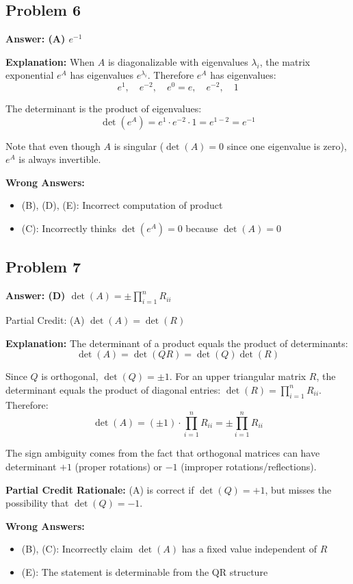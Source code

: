 \documentclass[12pt]{amsart}
\newcommand{\correct}[1]{{\color{correctgreen}\textbf{#1}}}
\newcommand{\partcred}[1]{{\color{partialblue}#1}}
\begin{document}
{\subsection*{Problem 6}
\correct{Answer: (A) $e^{-1}$}

\textbf{Explanation:} When $A$ is diagonalizable with eigenvalues $\lambda_i$, the matrix exponential $e^A$ has eigenvalues $e^{\lambda_i}$. Therefore $e^A$ has eigenvalues:
$$e^{1}, \quad e^{-2}, \quad e^{0} = e, \quad e^{-2}, \quad 1$$

The determinant is the product of eigenvalues:
$$\det(e^A) = e^{1} \cdot e^{-2} \cdot 1 = e^{1-2} = e^{-1}$$

Note that even though $A$ is singular ($\det(A) = 0$ since one eigenvalue is zero), $e^A$ is always invertible.

\textbf{Wrong Answers:}
\begin{itemize}
\item (B), (D), (E): Incorrect computation of product
\item (C): Incorrectly thinks $\det(e^A) = 0$ because $\det(A) = 0$
\end{itemize}

\subsection*{Problem 7}
\correct{Answer: (D) $\det(A) = \pm \prod_{i=1}^n R_{ii}$}

\partcred{Partial Credit: (A) $\det(A) = \det(R)$}

\textbf{Explanation:} The determinant of a product equals the product of determinants: 
$$\det(A) = \det(QR) = \det(Q)\det(R)$$

Since $Q$ is orthogonal, $\det(Q) = \pm 1$. For an upper triangular matrix $R$, the determinant equals the product of diagonal entries: $\det(R) = \prod_{i=1}^n R_{ii}$. Therefore:
$$\det(A) = (\pm 1) \cdot \prod_{i=1}^n R_{ii} = \pm \prod_{i=1}^n R_{ii}$$

The sign ambiguity comes from the fact that orthogonal matrices can have determinant $+1$ (proper rotations) or $-1$ (improper rotations/reflections).

\textbf{Partial Credit Rationale:} (A) is correct if $\det(Q) = +1$, but misses the possibility that $\det(Q) = -1$.

\textbf{Wrong Answers:}
\begin{itemize}
\item (B), (C): Incorrectly claim $\det(A)$ has a fixed value independent of $R$
\item (E): The statement is determinable from the QR structure
\end{itemize}

}
\end{document}

